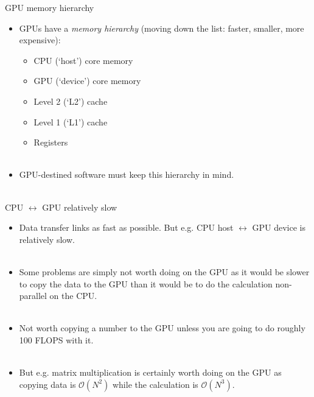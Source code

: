 \documentclass[usenames,dvipsnames]{beamer}
\begin{document}
\begin{frame}{GPU memory hierarchy}
  \begin{block}{}
    \begin{itemize}
      \item{GPUs have a \textit{memory hierarchy} (moving down the list: faster, smaller, more expensive):}
      \begin{itemize}
      \item{CPU (`host') core memory}
      \item{GPU (`device') core memory}
      \item{Level 2 (`L2') cache}
      \item{Level 1 (`L1') cache}
      \item{Registers}\\~\
      \end{itemize}
      \item{GPU-destined software must keep this hierarchy in mind.}\\~\
    \end{itemize}
  \end{block}
\end{frame}

\begin{frame}{CPU $\leftrightarrow$ GPU relatively slow}
  \begin{block}{}
    \begin{itemize}
      \item{Data transfer links as fast as possible. But e.g. CPU host $\leftrightarrow$ GPU device is relatively slow.}\\~\
      \item{Some problems are simply not worth doing on the GPU as it would be slower to copy the data to the GPU than it would be to do the calculation non-parallel on the CPU.}\\~\
      \item{Not worth copying a number to the GPU unless you are going to do roughly 100 FLOPS with it.}\\~\
      \item{But e.g. matrix multiplication is certainly worth doing on the GPU as copying data is $\mathcal{O}(N^2)$ while the calculation is $\mathcal{O}(N^3)$.}\\~\
    \end{itemize}
  \end{block}
\end{frame}
\end{document}
